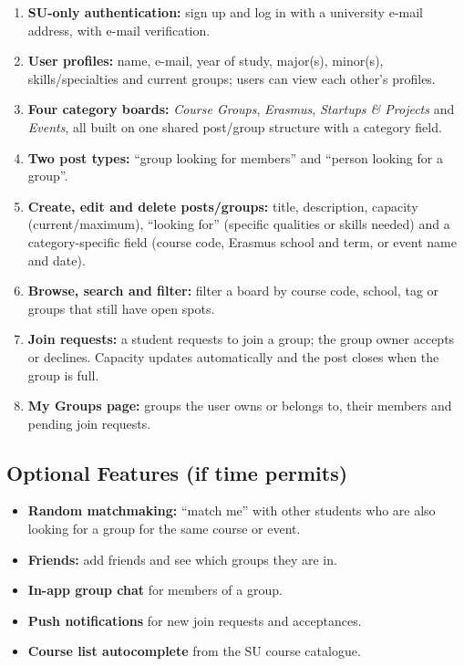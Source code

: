 \documentclass[11pt,a4paper]{article}
\begin{document}
\begin{enumerate}
  \item \textbf{SU-only authentication:} sign up and log in with a
        university e-mail address, with e-mail verification.
  \item \textbf{User profiles:} name, e-mail, year of study, major(s),
        minor(s), skills/specialties and current groups; users can view each
        other's profiles.
    \item \textbf{Four category boards:} \emph{Course Groups},
        \emph{Erasmus}, \emph{Startups \& Projects} and \emph{Events},
        all built on one shared post/group structure with a category field.
  \item \textbf{Two post types:} ``group looking for members'' and
        ``person looking for a group''.
  \item \textbf{Create, edit and delete posts/groups:} title, description,
        capacity (current/maximum), ``looking for'' (specific qualities or
        skills needed) and a category-specific field (course code, Erasmus
        school and term, or event name and date).
  \item \textbf{Browse, search and filter:} filter a board by course code,
        school, tag or groups that still have open spots.
  \item \textbf{Join requests:} a student requests to join a group; the group
        owner accepts or declines. Capacity updates automatically and the post
        closes when the group is full.
  \item \textbf{My Groups page:} groups the user owns or belongs to, their
        members and pending join requests.
\end{enumerate}

\subsection{Optional Features (if time permits)}
\begin{itemize}
  \item \textbf{Random matchmaking:} ``match me'' with other students who
        are also looking for a group for the same course or event.
  \item \textbf{Friends:} add friends and see which groups they are in.
  \item \textbf{In-app group chat} for members of a group.
  \item \textbf{Push notifications} for new join requests and acceptances.
  \item \textbf{Course list autocomplete} from the SU course catalogue.
\end{itemize}
\end{document}
